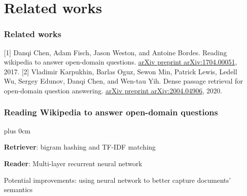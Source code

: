 \documentclass[11pt]{beamer}
\renewcommand{\raggedright}{\leftskip=0pt \rightskip=0pt plus 0cm}
\let\olditemize=\itemize
\renewenvironment{itemize}{\olditemize\raggedright}{\endlist}
\begin{document}
\section{Related works}
\begin{frame}
\frametitle{Related works}
\begin{thebibliography}{10}
	[1] Danqi Chen, Adam Fisch, Jason Weston, and Antoine Bordes. Reading wikipedia to answer open-domain questions. \underline{arXiv preprint arXiv:1704.00051}, 2017.
	[2] Vladimir Karpukhin, Barlas Oguz, Sewon Min, Patrick Lewis, Ledell Wu, Sergey Edunov, Danqi Chen, and Wen-tau Yih. Dense passage retrieval for open-domain	question answering. \underline{arXiv preprint arXiv:2004.04906}, 2020.
\end{thebibliography}
\end{frame}
\begin{frame}
\frametitle{Reading Wikipedia to answer open-domain questions}
\begin{itemize}
	\item \textbf{Retriever}: bigram hashing and TF-IDF matching
	\item \textbf{Reader}: Multi-layer recurrent neural network
	\item Potential improvements: using neural network to better capture documents' semantics
\end{itemize}
\end{frame}
\end{document}
